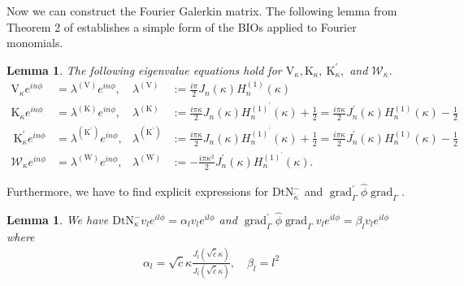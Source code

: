 \documentclass[12pt,journal,compsoc, onecolumn]{IEEEtran}
\newtheorem{lemma}[theorem]{Lemma}
\begin{document}
Now we can construct the Fourier Galerkin matrix. 
The following lemma from Theorem 2 of \cite{amini1998preconditioned} establishes a simple form of the BIOs applied to Fourier monomials.
\begin{lemma}
    The following eigenvalue equations hold for $\mathrm{V}_\kappa, \mathrm{K}_\kappa, \mathrm{~K}_{\kappa}^{\prime}, $ and $\mathcal{W}_{\kappa}$.
    $$
    \begin{aligned} 
        \mathrm{V}_{\kappa}e^{i n \phi} &=\lambda^{(\mathrm{V})} e^{i n \phi}, & \lambda^{(\mathrm{V})} &:=\frac{i \pi}{2} J_{n}(\kappa) H_{n}^{(1)}(\kappa) \\ 
        \mathrm{K}_{\kappa}e^{i n \phi} &=\lambda^{(\mathrm{K})} e^{i n \phi}, & \lambda^{(\mathrm{K})} &:=\frac{i \pi \kappa}{2} J_{n}(\kappa) H_{n}^{(1)^{\prime}}(\kappa)+\frac{1}{2}=\frac{i \pi \kappa}{2} J_{n}^{\prime}(\kappa) H_{n}^{(1)}(\kappa)-\frac{1}{2} \\ 
        \mathrm{~K}_{\kappa}^{\prime}e^{i n \phi} &=\lambda^{\left(\mathrm{K}^{\prime}\right)} e^{i n \phi}, & \lambda^{\left(\mathrm{K}^{\prime}\right)} &:=\frac{i \pi \kappa}{2} J_{n}(\kappa) H_{n}^{(1)^{\prime}}(\kappa)+\frac{1}{2}=\frac{i \pi \kappa}{2} J_{n}^{\prime}(\kappa) H_{n}^{(1)}(\kappa)-\frac{1}{2} \\ 
        \mathcal{W}_{\kappa}e^{i n \phi} &=\lambda^{(\mathrm{W})} e^{i n \phi}, & \lambda^{(\mathrm{W})} &:= - \frac{i \pi \kappa^{2}}{2} J_{n}^{\prime}(\kappa) H_{n}^{(1)^{\prime}}(\kappa).
    \end{aligned}
    $$
\end{lemma}
\noindent
Furthermore, we have to find explicit expressions for \(\mathrm{DtN}_{\tilde \kappa}^{-}\) and \(\operatorname{grad}_{\Gamma}^{\prime} \hat{\phi} \operatorname{grad}_{\Gamma}\). 
\begin{lemma}
    We have \(\mathrm{DtN}_{ \kappa}^{-} v_l e^{il\phi} = \alpha_l v_l e^{il\phi}\) and \(\operatorname{grad}_{\Gamma}^{\prime} \hat{\phi} \operatorname{grad}_{\Gamma} v_l e^{il\phi}= \beta_l v_l e^{il\phi}\) where 
    \begin{align}
        \alpha_l = \sqrt{\tilde c}\kappa \frac{J_l^\prime(\sqrt{\tilde c}\kappa )}{J_l(\sqrt{\tilde c}\kappa)}, \quad \beta_l = l^2
    \end{align}
\end{lemma}
\end{document}
